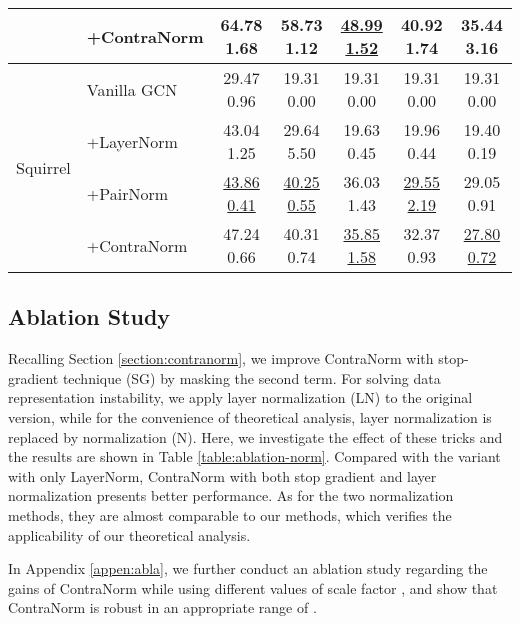 \documentclass{article}
\theoremstyle{definition}
\theoremstyle{remark}
\theoremstyle{theorem}
\begin{document}
\begin{table}[!t]
{\begin{tabular}{ll cc ccc}
		~ & +ContraNorm  & \cellcolor{blue!15}64.78  1.68 & \cellcolor{blue!15}58.73  1.12 & \underline{48.99  1.52} & \cellcolor{blue!15}40.92  1.74 & \cellcolor{blue!15}35.44  3.16 \\
		\midrule
		\multirow{4}{*}{Squirrel} & Vanilla GCN & 29.47  0.96 & 19.31  0.00 & 19.31  0.00 & 19.31  0.00 & 19.31  0.00 \\
		~ & +LayerNorm  & 43.04  1.25 & 29.64  5.50 & 19.63  0.45 & 19.96  0.44 & 19.40  0.19 \\
		~ & +PairNorm & \underline{43.86  0.41} & \underline{40.25  0.55} & \cellcolor{blue!15}36.03  1.43 & \underline{29.55  2.19} & \cellcolor{blue!15}29.05  0.91 \\
		~ & +ContraNorm  & \cellcolor{blue!15}47.24  0.66 & \cellcolor{blue!15}40.31  0.74 & \underline{35.85  1.58} & \cellcolor{blue!15}32.37  0.93 & \underline{27.80  0.72} \\
		\bottomrule    
	\end{tabular}
	}
	\label{table:gnn-acc}
 \vspace{-0.1 in}
\end{table}


\subsection{Ablation Study}

Recalling Section \ref{section:contranorm}, we improve ContraNorm with stop-gradient technique (SG) by masking the second term. For solving data representation instability, we apply layer normalization (LN) to the original version, while for the convenience of theoretical analysis, layer normalization is replaced by  normalization (N). Here, we investigate the effect of these tricks and the results are shown in Table \ref{table:ablation-norm}. Compared with the variant with only LayerNorm, ContraNorm with both stop gradient and layer normalization presents better performance. As for the two normalization methods, they are almost comparable to our methods, which verifies the applicability of our theoretical analysis. 

In Appendix \ref{appen:abla}, we further conduct an ablation study regarding the gains of ContraNorm while using different values of scale factor , and show that ContraNorm is robust in an appropriate range of .
\end{document}
